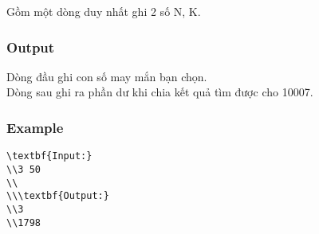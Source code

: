    Gồm một dòng duy nhất ghi 2 số N, K.  

\subsubsection{   Output  }

   Dòng đầu ghi con số may mắn bạn chọn.   
\\   Dòng sau ghi ra phần dư khi chia kết quả tìm được cho 10007.  

\subsubsection{   Example  }
\begin{verbatim}
\textbf{Input:}
\\3 50
\\
\\\textbf{Output:}
\\3
\\1798\end{verbatim}